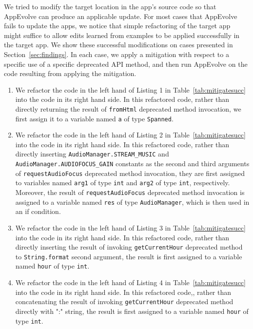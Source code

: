 We tried to modify the target location in the app's source code so that
AppEvolve can produce an applicable update. For most cases that AppEvolve
fails to update the apps, we notice that simple refactoring of the target
app might suffice to allow edits learned from examples to be applied
successfully in the target app. We show these successful modifications on
cases presented in Section~\ref{sec:findings}. In each case, we apply a
mitigation with respect to a specific use of a specific deprecated API
method, and then run AppEvolve on the code resulting from applying the
mitigation.

\begin{enumerate}
\item We refactor the code in the left hand of Listing 1 in Table~\ref{tab:mitigatesucc} into the code in its right hand side. In this refactored code, rather than directly returning the result of {\tt fromHtml} deprecated method invocation, we first assign it to a variable named {\tt a} of type {\tt Spanned}. %

\item We refactor the code in the left hand of Listing 2 in Table~\ref{tab:mitigatesucc} into the code in its right hand side. In this refactored code, rather than directly inserting {\tt AudioManager.STREAM\_MUSIC} and {\tt AudioManager.AUDIOFOCUS\_GAIN} constants as the second and third arguments of {\tt requestAudioFocus} deprecated method invocation, they are first assigned to variables named {\tt arg1} of type {\tt int} and {\tt arg2} of type {\tt int}, respectively. Moreover, the result of {\tt requestAudioFocus} deprecated method invocation is assigned to a variable  named {\tt res} of type {\tt AudioManager}, which is then used in an if condition.

\item We refactor the code in the left hand of Listing 3 in  Table~\ref{tab:mitigatesucc} into the code in its right hand side. In this refactored code, rather than directly inserting the result of invoking {\tt getCurrentHour} deprecated method to {\tt String.format} second argument, the result is first assigned to a variable named {\tt hour} of type {\tt int}.

\item We refactor the code in the left hand of Listing 4 in  Table~\ref{tab:mitigatesucc} into the code in its right hand side. In this refactored code,, rather than concatenating the result of invoking {\tt getCurrentHour} deprecated method directly with ":" string, the result is first assigned to a variable named {\tt hour} of type {\tt int}.


\end{enumerate}
